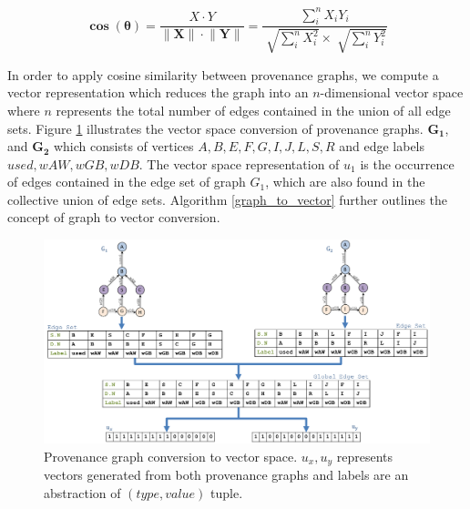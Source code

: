 \[\mathbf{\cos{(\theta)}} = \dfrac{X \cdot  Y}{ \lVert \mathbf{X} \rVert \cdot \lVert \mathbf{Y} \rVert} =\dfrac{\sum_{i}^n X_i Y_i }{\sqrt[]{\sum_{i}^n X_i^2} \times \sqrt[]{\sum_{i}^n Y_i^2}}  \]



\par In order to apply cosine similarity between provenance graphs, we compute a vector representation which reduces the graph into an $n$-dimensional vector space where $n$ represents the total number of edges contained in the union of all edge sets. Figure \ref{prov_vector} illustrates the vector space conversion of provenance graphs. $\boldsymbol{G_1}$, and $\boldsymbol{G_2}$ which consists of vertices $A,B,E,F,G, I, J, L, S, R$ and edge labels $used, wAW, wGB, wDB$. The vector space representation of $u_1$ is the occurrence of edges contained in the edge set of graph $G_1$, which  are also found in the collective union of edge sets. Algorithm \ref{graph_to_vector} further outlines the concept of graph to vector conversion.

\begin{figure}[h!]
\begin{center}
\includegraphics[width=\textwidth]{Picture_13_edit_5.pdf}
\end{center}
\caption{Provenance graph conversion to vector space. $u_x, u_y$ represents vectors generated from both provenance graphs and labels are an abstraction of $(type, value)$ tuple. }
\label{prov_vector}
\end{figure}

